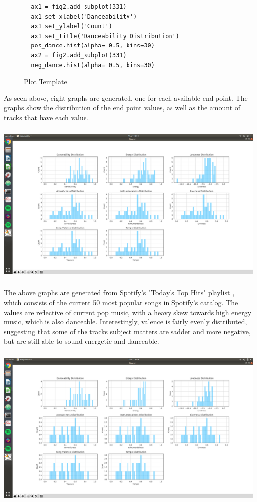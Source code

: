 \begin{figure}[!h]
\begin{lstlisting}
  ax1 = fig2.add_subplot(331)
  ax1.set_xlabel('Danceability')
  ax1.set_ylabel('Count')
  ax1.set_title('Danceability Distribution')
  pos_dance.hist(alpha= 0.5, bins=30)
  ax2 = fig2.add_subplot(331)
  neg_dance.hist(alpha= 0.5, bins=30)
\end{lstlisting}
\caption{Plot Template}
\end{figure}

As seen above, eight graphs are generated, one for each available end point. The
graphs show the distribution of the end point values, as well as the amount of
tracks that have each value.

\begin{center}
\includegraphics[height=8cm]{images/before.png}
\end{center}

The above graphs are generated from Spotify's "Today's Top Hits" playlist
\cite{Spotify:19}, which consists of the current 50 most popular songs in
Spotify's catalog. The values are reflective of current pop music, with a
heavy skew towards high energy music, which is also danceable. Interestingly,
valence is fairly evenly distributed, suggesting that some of the tracks subject
matters are sadder and more negative, but are still able to sound energetic
and danceable.

\includegraphics[height=8cm]{images/after.png}

